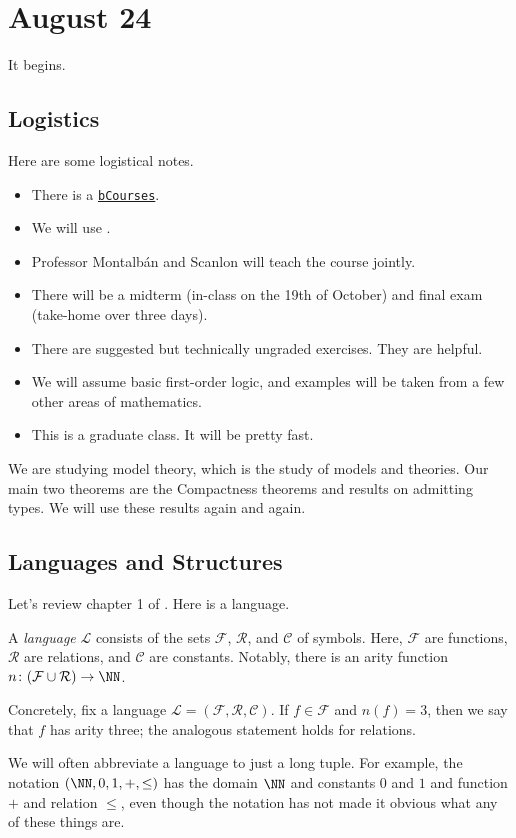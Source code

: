 \documentclass[../notes.tex]{subfiles}
\begin{document}
\section{August 24}

It begins.

\subsection{Logistics}
Here are some logistical notes.
\begin{itemize}
	\item There is a \href{https://bcourses.berkeley.edu/courses/1528862}{\texttt{bCourses}}.
	\item We will use \cite{marker}.
	\item Professor Montalb\'an and Scanlon will teach the course jointly.
	\item There will be a midterm (in-class on the 19th of October) and final exam (take-home over three days).
	\item There are suggested but technically ungraded exercises. They are helpful.
	\item We will assume basic first-order logic, and examples will be taken from a few other areas of mathematics.
	\item This is a graduate class. It will be pretty fast.
\end{itemize}
We are studying model theory, which is the study of models and theories. Our main two theorems are the Compactness theorems and results on admitting types. We will use these results again and again.

\subsection{Languages and Structures}
Let's review chapter 1 of \cite{marker}. Here is a language.
\begin{definition}[language]
	A \textit{language} $\mathcal L$ consists of the sets $\mathcal F$, $\mathcal R$, and $\mathcal C$ of symbols. Here, $\mathcal F$ are functions, $\mathcal R$ are relations, and $\mathcal C$ are constants. Notably, there is an arity function $n\colon(\mathcal F\cup\mathcal R)\to\NN$.
\end{definition}
Concretely, fix a language $\mathcal L=(\mathcal F,\mathcal R,\mathcal C)$. If $f\in\mathcal F$ and $n(f)=3$, then we say that $f$ has arity three; the analogous statement holds for relations.

We will often abbreviate a language to just a long tuple. For example, the notation $(\NN,0,1,+,\le)$ has the domain $\NN$ and constants $0$ and $1$ and function $+$ and relation $\le$, even though the notation has not made it obvious what any of these things are.
\end{document}
